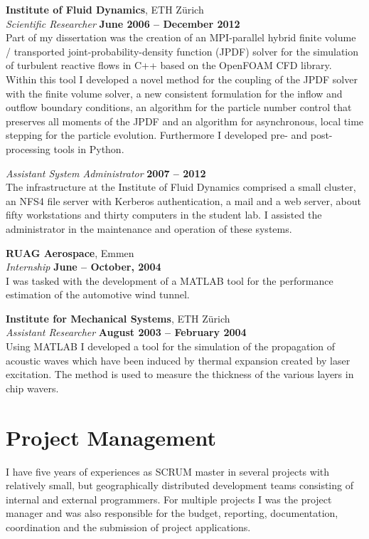 \documentclass[line,11pt,a4paper]{resume}
\begin{document}
\begin{resume}
\textbf{Institute of Fluid Dynamics}, ETH Z\"urich \vspace{2mm}\\\vspace{1mm}%
\textsl{Scientific Researcher} \hfill \textbf{June 2006 -- December 2012}\\
Part of my dissertation was the creation of an MPI-parallel hybrid finite
volume / transported joint-probability-density function (JPDF) solver for the
simulation of turbulent reactive flows in C++ based on the OpenFOAM CFD
library. Within this tool I developed a novel method for the coupling of the
JPDF solver with the finite volume solver, a new consistent formulation for the
inflow and outflow boundary conditions, an algorithm for the particle number
control that preserves all moments of the JPDF and an algorithm for
asynchronous, local time stepping for the particle evolution. Furthermore I
developed pre- and post-processing tools in Python.

\textsl{Assistant System Administrator} \hfill \textbf{2007 -- 2012}\\
The infrastructure at the Institute of Fluid Dynamics comprised a small
cluster, an NFS4 file server with Kerberos authentication, a mail and a web
server, about fifty workstations and thirty computers in the student lab. I
assisted the administrator in the maintenance and operation of these systems.

\textbf{RUAG Aerospace}, Emmen \vspace{2mm}\\\vspace{1mm}%
\textsl{Internship} \hfill \textbf{June -- October, 2004}\\
I was tasked with the development of a MATLAB tool for the performance estimation
of the automotive wind tunnel.

\textbf{Institute for Mechanical Systems}, ETH Z\"urich \vspace{2mm}\\\vspace{1mm}%
\textsl{Assistant Researcher} \hfill \textbf{August 2003 -- February 2004}\\
Using MATLAB I developed a tool for the simulation of the propagation of
acoustic waves which have been induced by thermal expansion created by laser
excitation. The method is used to measure the thickness of the various layers
in chip wavers.

\pagebreak
\section{\mysidestyle Project Management}\vspace{2mm}
I have five years of experiences as SCRUM master in several projects with
relatively small, but geographically distributed development teams consisting
of internal and external programmers. For multiple projects I was
the project manager and was also responsible for the budget, reporting,
documentation, coordination and the submission of project applications.


\end{resume}
\end{document}
